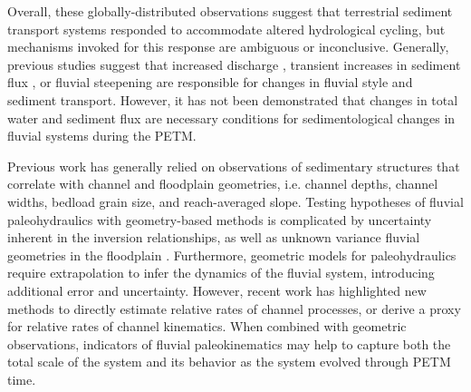 \documentclass[draft]{compact_proposal}
\begin{document}
Overall, these globally-distributed observations suggest that terrestrial sediment transport systems responded to accommodate altered hydrological cycling, but mechanisms invoked for this response are ambiguous or inconclusive.
Generally, previous studies suggest that increased discharge , transient increases in sediment flux , or fluvial steepening \cnote[bzf 2014] are responsible for changes in fluvial style and sediment transport.
However, it has not been demonstrated that changes in total water and sediment flux are necessary conditions for sedimentological changes in fluvial systems during the PETM.

Previous work has generally relied on observations of sedimentary structures that correlate with channel and floodplain geometries, i.e. channel depths, channel widths, bedload grain size, and reach-averaged slope.
Testing hypotheses of fluvial paleohydraulics with geometry-based methods is complicated by uncertainty inherent in the inversion relationships, as well as unknown variance fluvial geometries in the floodplain .
Furthermore, geometric models for paleohydraulics require extrapolation to infer the dynamics of the fluvial system, introducing additional error and uncertainty.
However, recent work has highlighted new methods to directly estimate relative rates of channel processes, or derive a proxy for relative rates of channel kinematics.
When combined with geometric observations, indicators of fluvial paleokinematics may help to capture both the total scale of the system and its behavior as the system evolved through PETM time.


\end{document}
